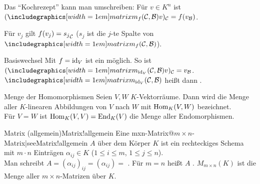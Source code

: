
\begin{Kor}
    Das "`Kochrezept"' kann man umschreiben:
    Für $v \in K^n$ ist
    $(\hommatrix{f}{C}{B}v)_\basis{C} = f(v_\basis{B})$.
\end{Kor}

\begin{Kor}
    Für $v_j$ gilt $f(v_j) = {s_j}_{\mathcal{C}}$
    ($s_j$ ist die $j$-te Spalte von $\hommatrix{f}{C}{B}$).
\end{Kor}

\begin{Def}{Basiswechsel}
    Mit $f = \operatorname{id}_V$ ist ein  möglich.
    So ist $(\hommatrix{\id_V}{C}{B}v)_\basis{C} = v_\basis{B}$. \\
    $\hommatrix{\id_V}{C}{B}$ heißt dann .
\end{Def}

\begin{Def}{Menge der Homomorphismen}
    Seien $V, W$ $K$-Vektorräume.
    Dann wird die Menge aller $K$-linearen Abbildungen von $V$ nach $W$ mit
    $\operatorname{Hom}_K(V, W)$ bezeichnet. \\
    Für $V = W$ ist $\operatorname{Hom}_K(V, V) = \operatorname{End}_K(V)$ die Menge aller Endomorphismen.
\end{Def}

\begin{xDef}{Matrix (allgemein)}{Matrix!allgemein}
    Eine %
    {mxn-Matrix@$m \times n$-Matrix|see{Matrix!allgemein}}
    $A$ über dem Körper $K$ ist ein
    rechteckiges Schema mit $m \cdot n$ Einträgen $\alpha_{ij} \in K$
    ($1 \le i \le m$, $1 \le j \le n$). \\
    Man schreibt $A = (\alpha_{ij})_{ij} = (\alpha_{ij}) =$
    .
    Für $m = n$ heißt $A$ .
    $M_{m \times n}(K)$ ist die Menge aller $m \times n$-Matrizen über $K$.
\end{xDef}

